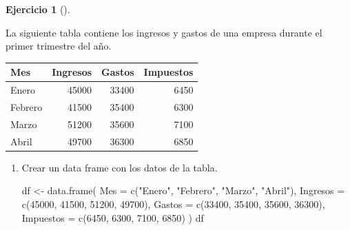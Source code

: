 \documentclass[
  spanish,
  a4paper,
]{scrreport}
\newenvironment{Shaded}{\begin{snugshade}}{\end{snugshade}}
\newcommand{\AttributeTok}[1]{\textcolor[rgb]{0.40,0.45,0.13}{#1}}
\newcommand{\DecValTok}[1]{\textcolor[rgb]{0.68,0.00,0.00}{#1}}
\newcommand{\FunctionTok}[1]{\textcolor[rgb]{0.28,0.35,0.67}{#1}}
\newcommand{\NormalTok}[1]{\textcolor[rgb]{0.00,0.23,0.31}{#1}}
\newcommand{\OtherTok}[1]{\textcolor[rgb]{0.00,0.23,0.31}{#1}}
\newcommand{\StringTok}[1]{\textcolor[rgb]{0.13,0.47,0.30}{#1}}
\theoremstyle{definition}
\newtheorem{exercise}{Ejercicio}[chapter]
\theoremstyle{remark}
\begin{document}
\begin{exercise}[]\protect\hypertarget{exr-preprocesamiento-1}{}\label{exr-preprocesamiento-1}

La siguiente tabla contiene los ingresos y gastos de una empresa durante
el primer trimestre del año.

\begin{longtable}[]{@{}lrrr@{}}
\toprule\noalign{}
Mes & Ingresos & Gastos & Impuestos \\
\midrule\noalign{}
\endhead
\bottomrule\noalign{}
\endlastfoot
Enero & 45000 & 33400 & 6450 \\
Febrero & 41500 & 35400 & 6300 \\
Marzo & 51200 & 35600 & 7100 \\
Abril & 49700 & 36300 & 6850 \\
\end{longtable}

\begin{enumerate}
\def\labelenumi{\alph{enumi}.}
\item
  Crear un data frame con los datos de la tabla.

  \begin{tcolorbox}[enhanced jigsaw, titlerule=0mm, arc=.35mm, rightrule=.15mm, opacitybacktitle=0.6, leftrule=.75mm, colframe=quarto-callout-tip-color-frame, toptitle=1mm, breakable, colbacktitle=quarto-callout-tip-color!10!white, bottomrule=.15mm, colback=white, left=2mm, bottomtitle=1mm, opacityback=0, title=\textcolor{quarto-callout-tip-color}{\faLightbulb}\hspace{0.5em}{Solución}, toprule=.15mm, coltitle=black]

\begin{Shaded}
\begin{Highlighting}[]
\NormalTok{df }\OtherTok{\textless{}{-}} \FunctionTok{data.frame}\NormalTok{(}
    \AttributeTok{Mes =} \FunctionTok{c}\NormalTok{(}\StringTok{"Enero"}\NormalTok{, }\StringTok{"Febrero"}\NormalTok{, }\StringTok{"Marzo"}\NormalTok{, }\StringTok{"Abril"}\NormalTok{),}
    \AttributeTok{Ingresos =} \FunctionTok{c}\NormalTok{(}\DecValTok{45000}\NormalTok{, }\DecValTok{41500}\NormalTok{, }\DecValTok{51200}\NormalTok{, }\DecValTok{49700}\NormalTok{),}
    \AttributeTok{Gastos =} \FunctionTok{c}\NormalTok{(}\DecValTok{33400}\NormalTok{, }\DecValTok{35400}\NormalTok{, }\DecValTok{35600}\NormalTok{, }\DecValTok{36300}\NormalTok{),}
    \AttributeTok{Impuestos =} \FunctionTok{c}\NormalTok{(}\DecValTok{6450}\NormalTok{, }\DecValTok{6300}\NormalTok{, }\DecValTok{7100}\NormalTok{, }\DecValTok{6850}\NormalTok{)}
\NormalTok{    )}
\NormalTok{df }
\end{Highlighting}
\end{Shaded}


\end{tcolorbox}
\end{enumerate}
\end{exercise}
\end{document}
